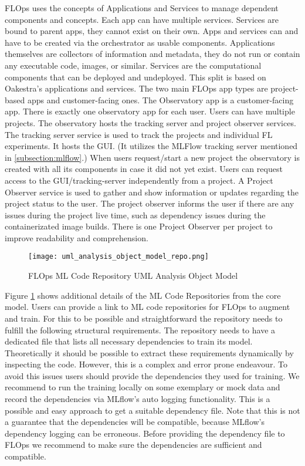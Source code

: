 FLOps uses the concepts of Applications and Services to manage dependent components and concepts.
Each app can have multiple services.
Services are bound to parent apps, they cannot exist on their own.
Apps and services can and have to be created via the orchestrator as usable components.
Applications themselves are collectors of information and metadata, they do not run or contain any executable code, images, or similar.
Services are the computational components that can be deployed and undeployed.
This split is based on Oakestra's applications and services.
The two main FLOps app types are project-based apps and customer-facing ones.
The Observatory app is a customer-facing app.
There is exactly one observatory app for each user.
Users can have multiple projects.
The observatory hosts the tracking server and project observer services.
The tracking server service is used to track the projects and individual FL experiments.
It hosts the GUI. 
(It utilizes the MLFlow tracking server mentioned in \ref{subsection:mlflow}.)
When users request/start a new project the observatory is created with all its components in case it did not yet exist.
Users can request access to the GUI/tracking-server independently from a project.
A Project Observer service is used to gather and show information or updates regarding the project status to the user.
The project observer informs the user if there are any issues during the project live time, such as dependency issues during the containerizated image builds.
There is one Project Observer per project to improve readability and comprehension.

\begin{figure}[h]
    \centering
    \texttt{[image: uml\_analysis\_object\_model\_repo.png]}
    \caption{FLOps ML Code Repository UML Analysis Object Model}
    \label{fig:uml_repo_analysis_object_model}
\end{figure}

Figure \ref{fig:uml_repo_analysis_object_model} shows additional details of the ML Code Repositories from the core model.
Users can provide a link to ML code repositories for FLOps to augment and train.
For this to be possible and straightforward the repository needs to fulfill the following structural requirements.
The repository needs to have a dedicated file that lists all necessary dependencies to train its model.
Theoretically it should be possible to extract these requirements dynamically by inspecting the code.
However, this is a complex and error prone endeavour.
To avoid this issues users should provide the dependencies they used for training.
We recommend to run the training locally on some exemplary or mock data and record the dependencies via MLflow's auto logging functionality.
This is a possible and easy approach to get a suitable dependency file.
Note that this is not a guarantee that the dependencies will be compatible, because MLflow's dependency logging can be erroneous.
Before providing the dependency file to FLOps we recommend to make sure the dependencies are sufficient and compatible.


